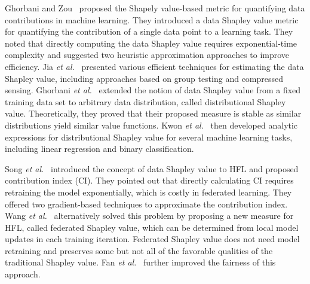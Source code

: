 Ghorbani and Zou~\cite{ghorbani2019data} proposed the Shapely value-based metric for quantifying data contributions in machine learning. They introduced a data Shapley value metric for quantifying the contribution of a single data point to a learning task. They noted that directly computing the data Shapley value requires exponential-time complexity and suggested two heuristic approximation approaches to improve efficiency. Jia \textit{et al.}~\cite{jia2019towards} presented various efficient techniques for estimating the data Shapley value, including approaches based on group testing and compressed sensing. Ghorbani \textit{et al.}~\cite{ghorbani2020distributional} extended the notion of data Shapley value from a fixed training data set to arbitrary data distribution, called distributional Shapley value. Theoretically, they proved that their proposed measure is stable as similar distributions yield similar value functions. Kwon \textit{et al.}~\cite{kwon2021efficient} then developed analytic expressions for distributional Shapley value for several machine learning tasks, including linear regression and binary classification.

Song \textit{et al.}~\cite{song2019profit} introduced the concept of data Shapley value to HFL and proposed contribution index (CI). They pointed out that directly calculating CI requires retraining the model exponentially, which is costly in federated learning. They offered two gradient-based techniques to approximate the contribution index. Wang \textit{et al.}~\cite{wang2020principled} alternatively solved this problem by proposing a new measure for HFL, called federated Shapley value, which can be determined from local model updates in each training iteration. Federated Shapley value does not need model retraining and preserves some but not all of the favorable qualities of the traditional Shapley value. Fan \textit{et al.}~\cite{fan2021improving} further improved the fairness of this approach. 

